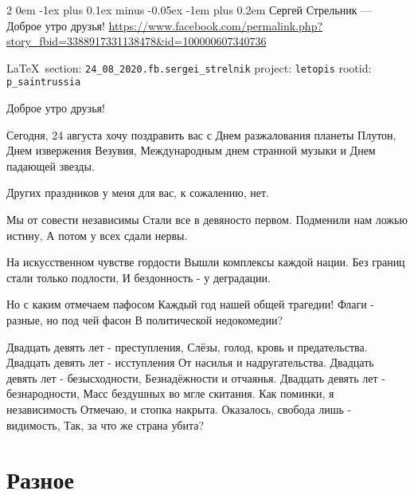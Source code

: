 \documentclass[a4paper,11pt]{extreport}
\makeatletter
\renewcommand\subsection{%
  \clearpage
    \@startsection{subsection}%
    {2}%
    {0em}%
    {-1ex plus 0.1ex minus -0.05ex}%
    {-1em plus 0.2em}%
    {\scshape\bfseries\Large}%
}
\makeatother
\begin{document}
\subsection{Сергей Стрельник --- Доброе утро друзья!}
\label{sec:24_08_2020.fb.sergei_strelnik}
\url{https://www.facebook.com/permalink.php?story_fbid=3388917331138478&id=100000607340736}
  
\vspace{0.5cm}
 {\ifDEBUG\small\LaTeX~section: \verb|24_08_2020.fb.sergei_strelnik| project: \verb|letopis| rootid: \verb|p_saintrussia| \fi}
\vspace{0.5cm}
  
Доброе утро друзья!

Сегодня, 24 августа хочу поздравить вас с Днем разжалования планеты Плутон, Днем извержения Везувия, Международным днем странной музыки и Днем падающей звезды.

Других праздников у меня для вас, к сожалению, нет.

\begin{multicols}{2}
	\obeycr
Мы от совести независимы
Стали все в девяносто первом.
Подменили нам ложью истину,
А потом у всех сдали нервы.

На искусственном чувстве гордости
Вышли комплексы каждой нации.
Без границ стали только подлости,
И бездонность - у деградации.

Но с каким отмечаем пафосом
Каждый год нашей общей трагедии!
Флаги - разные, но под чей фасон
В политической недокомедии?

Двадцать девять лет - преступления,
Слёзы, голод, кровь и предательства.
Двадцать девять лет - исступления
От насилья и надругательства.
Двадцать девять лет - безысходности,
Безнадёжности и отчаянья.
Двадцать девять лет - безнародности,
Масс бездушных во мгле скитания.
Как поминки, я независимость
Отмечаю, и стопка накрыта.
Оказалось, свобода лишь - видимость,
Так, за что же страна убита?  
	\restorecr
\end{multicols}





 
 

\part{Разное}
\label{sec:other}
 
\end{document}
